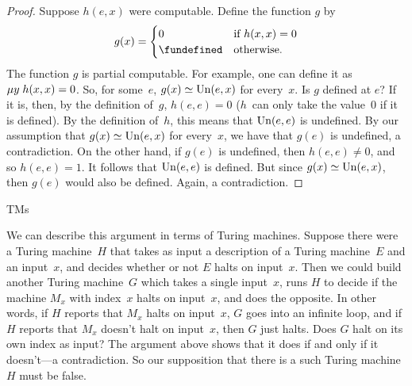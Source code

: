 \documentclass[../../../include/open-logic-section]{subfiles}
\begin{document}
\begin{proof}
Suppose $h(e,x)$ were computable. Define the function $g$ by
\[
g(x) =
\begin{cases}
  0                & \text{if $h(x,x) = 0$} \\
  \fundefined & \text{otherwise.}
\end{cases}
\]
The function $g$ is partial computable. For example, one can define it
as $\mu y \; h(x,x) = 0$. So, for some~$e$, $g(x) \simeq \mathrm{Un}(e,
x)$ for every~$x$. Is $g$ defined at $e$?  If it is, then, by the
definition of~$g$, $h(e,e) = 0$ ($h$~can only take the value~$0$ if it
is defined). By the definition of~$h$, this means that $\mathrm{Un}(e, e)$
is undefined. By our assumption that $g(x) \simeq \mathrm{Un}(e, x)$
for every~$x$, we have that $g(e)$ is undefined, a contradiction.
On the other hand, if $g(e)$ is undefined, then $h(e,e) \neq 0$, and
so $h(e,e) = 1$. It follows that $\mathrm{Un}(e, e)$ is defined. But since
$g(x) \simeq \mathrm{Un}(e, x)$, then $g(e)$ would also be defined. Again,
a contradiction.
\end{proof}

\begin{tagblock}{TMs}
\begin{explain}
We can describe this argument in terms of Turing machines.  Suppose
there were a Turing machine~$H$ that takes as input a description of a
Turing machine~$E$ and an input~$x$, and decides whether or not $E$
halts on input~$x$. Then we could build another Turing machine~$G$
which takes a single input~$x$, runs $H$ to decide if the machine
$M_x$ with index~$x$ halts on input~$x$, and does the opposite. In
other words, if $H$ reports that $M_x$ halts on input~$x$, $G$ goes
into an infinite loop, and if $H$ reports that $M_x$ doesn't halt on
input~$x$, then $G$ just halts. Does $G$ halt on its own index as
input? The argument above shows that it does if and only if it
doesn't---a contradiction. So our supposition that there is a such
Turing machine~$H$ must be false.
\end{explain}
\end{tagblock}
\end{document}
